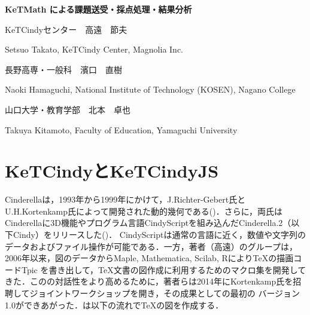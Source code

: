 \documentclass[a4j,12pt]{ujarticle}
\begin{document}
\begin{center}

{\bf \Large KeTMath による課題送受・採点処理・結果分析}

\end{center}

\mbox{}

\begin{center}

KeTCindyセンター　高遠　節夫

Setsuo Takato, KeTCindy Center, Magnolia Inc.


長野高専・一般科　濱口　直樹

Naoki Hamaguchi, National Institute of Technology (KOSEN), Nagano College

山口大学・教育学部　北本　卓也

Takuya Kitamoto, Faculty of Education, Yamaguchi University

\end{center}

\section{KeTCindyとKeTCindyJS}

Cinderellaは，1993年から1999年にかけて，J.Richter-Gebert氏とU.H.Kortenkamp氏によって開発された動的幾何である(\cite{Cinderella1})．さらに，両氏はCinderellaに3D機能やプログラム言語CindyScriptを組み込んだCinderella.2（以下Cindy）をリリースした(\cite{Cinderella2})．
CindyScriptは通常の言語に近く，数値や文字列のデータおよびファイル操作が可能である．一方，著者（高遠）のグループは，2006年以来，図のデータからMaple, Mathematica, Scilab, Rにより\TeX の描画コードTpic を書き出して，\TeX 文書の図作成に利用するためのマクロ集\ketpic を開発してきた．この\ketpic の対話性をより高めるために，著者らは2014年にKortenkamp氏を招聘してジョイントワークショップを開き，その成果として\ketcindy の最初の
バージョン1.0ができあがった．\ketcindy は以下の流れで\TeX の図を作成する．\vspace{-2mm}
\end{document}
